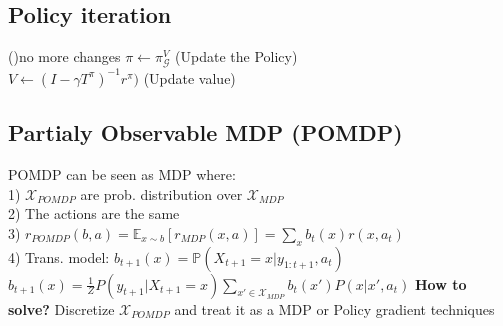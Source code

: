 \subsection{Policy iteration}
\begin{algorithm}[H]
    \While(){no more changes}{
        $\pi \gets \pi_\mathcal{G}^{V}$ (Update the Policy)\\
        $V \gets (I-\gamma T^\pi)^{-1}r^\pi)$ (Update value)
    }
\end{algorithm}

\subsection{Partialy Observable MDP (POMDP)}
POMDP can be seen as MDP where:\\
1) $\mathcal{X}_{POMDP}$ are prob. distribution over $\mathcal{X}_{MDP}$\\
2) The actions are the same\\
3) $r_{POMDP}(b, a)= \mathbb{E}_{x\sim b}\left[r_{MDP}(x, a)\right]=\sum_{x}b_{t}(x)r(x,a_{t})$\\
4) Trans. model: $b_{t+1}(x) = \mathbb{P}(X_{t+1}=x\vert y_{1:t+1}, a_t)$\\
$b_{t+1}(x) =${\scriptsize $\frac{1}{Z}P(y_{t+1}\vert X_{t+1}=x)\sum_{x'\in \mathcal{X}_{MDP}}b_t(x')P(x\vert x', a_t)$} %
\textbf{How to solve?} Discretize $\mathcal{X}_{POMDP}$ and treat it as a MDP or Policy gradient techniques